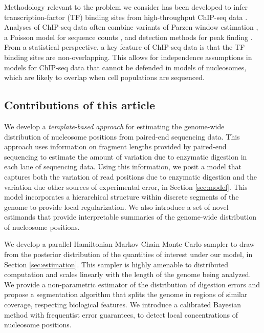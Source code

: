 Methodology relevant to the problem we consider has been developed to infer transcription-factor (TF) binding sites from high-throughput ChIP-seq data \citep{park:2009}.
Analyses of ChIP-seq data often combine variants of Parzen window estimation \citep{Schwartzman2011a}, a Poisson model for sequence counts \citep{Zhang2008}, and detection methods for peak finding \citep{Pepke2009}.
%
From a statistical perspective, a key feature of ChIP-seq data is that the TF binding sites are non-overlapping.
This allows for independence assumptions in models for ChIP-seq data \citep{bars:zhao:2009} that cannot be defended in models of nucleosomes, which are likely to overlap when cell populations are sequenced.


\subsection{Contributions of this article}


We develop a {\em template-based approach} for estimating the genome-wide distribution of nucleosome positions from paired-end sequencing data.
This approach uses information on fragment lengths provided by paired-end sequencing to estimate the amount of variation due to enzymatic digestion in each lane of sequencing data.
Using this information, we posit a model that captures both the variation of read positions due to enzymatic digestion and the variation due other sources of experimental error, in Section \ref{sec:model}.
This model incorporates a hierarchical structure within discrete segments of the genome to provide local regularization.
We also introduce a set of novel estimands that provide interpretable summaries of the genome-wide distribution of nucleosome positions.

We develop a parallel Hamiltonian Markov Chain Monte Carlo sampler to draw from the posterior distribution of the quantities of interest under our model, in Section \ref{sec:estimation}.
This sampler is highly amenable to distributed computation and scales  linearly with the length of the genome being analyzed.
We provide a non-parametric estimator of the distribution of digestion errors and propose a segmentation algorithm that splits the genome in regions of similar coverage, respecting biological features.
We introduce a calibrated Bayesian method with frequentist error guarantees, to detect local concentrations of nucleosome positions.

